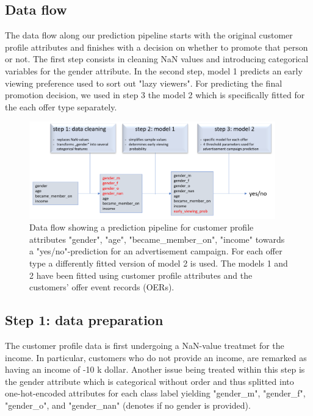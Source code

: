 \documentclass[11pt]{article} %
\begin{document}
\subsection{Data flow}
The data flow along our prediction pipeline starts with the original customer profile attributes and finishes with a decision on whether to promote that person or not. The first step consists in cleaning NaN values and introducing categorical variables for the gender attribute. In the second step, model 1 predicts an early viewing preference used to sort out "lazy viewers".  For predicting the final promotion decision, we used in step 3 the model 2 which is specifically fitted for the each offer type separately.
\begin{figure}[H]
\includegraphics[width=0.95\textwidth]{dataflow.png}
\caption{Data flow showing a prediction  pipeline for customer profile attributes  "gender", "age", "became\_member\_on", "income" towards a "yes/no"-prediction for an advertisement campaign. For each offer type a differently fitted version of model 2 is used. The models 1 and 2 have been fitted using customer profile attributes and the customers' offer event records (OERs).}
\end{figure}

\subsection{Step 1: data preparation}
The customer profile data is first undergoing a NaN-value treatmet for the income.
In particular, customers who do not provide an income, are remarked as having an income of -10 k dollar.
Another issue being treated within this step is the gender attribute which is categorical without order and thus splitted into one-hot-encoded attributes for each class label yielding "gender\_m", "gender\_f", "gender\_o",  and "gender\_nan" (denotes if no gender is provided).
\end{document}
